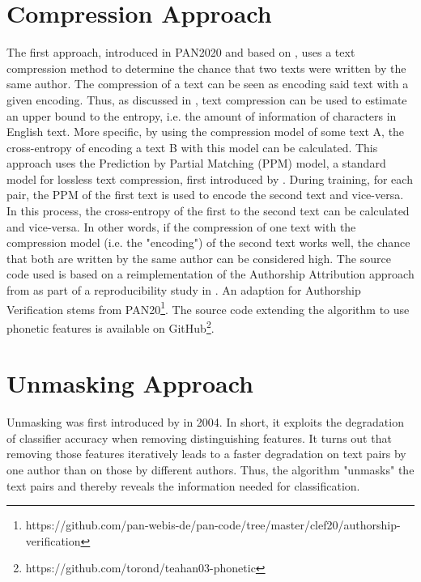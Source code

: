 \section{Compression Approach}
The first approach, introduced in PAN2020 and based on \cite{teahan2003compression}, uses a text compression method to determine the chance that two texts were written by the same author.
The compression of a text can be seen as encoding said text with a given encoding.
Thus, as discussed in \cite{brown1992upperBoundEntropy}, text compression can be used to estimate an upper bound to the entropy, i.e. the amount of information of characters in English text.
More specific, by using the compression model of some text A, the cross-entropy of encoding a text B with this model can be calculated.
This approach uses the Prediction by Partial Matching (PPM) model, a standard model for lossless text compression, first introduced by \cite{cleary1984PPM}.
During training, for each pair, the PPM of the first text is used to encode the second text and vice-versa.
In this process, the cross-entropy of the first to the second text can be calculated and vice-versa.
In other words, if the compression of one text with the compression model (i.e. the "encoding") of the second text works well, the chance that both are written by the same author can be considered high.
The source code used is based on a reimplementation of the Authorship Attribution approach from \cite{teahan2003compression} as part of a reproducibility study in \cite{potthast2016reimplementation}.
An adaption for Authorship Verification stems from PAN20\footnote{https://github.com/pan-webis-de/pan-code/tree/master/clef20/authorship-verification}.
The source code extending the algorithm to use phonetic features is available on GitHub\footnote{https://github.com/torond/teahan03-phonetic}.

\section{Unmasking Approach}
Unmasking was first introduced by \cite{koppel2004unmasking} in 2004.
In short, it exploits the degradation of classifier accuracy when removing distinguishing features.
It turns out that removing those features iteratively leads to a faster degradation on text pairs by one author than on those by different authors.
Thus, the algorithm "unmasks" the text pairs and thereby reveals the information needed for classification.\\


